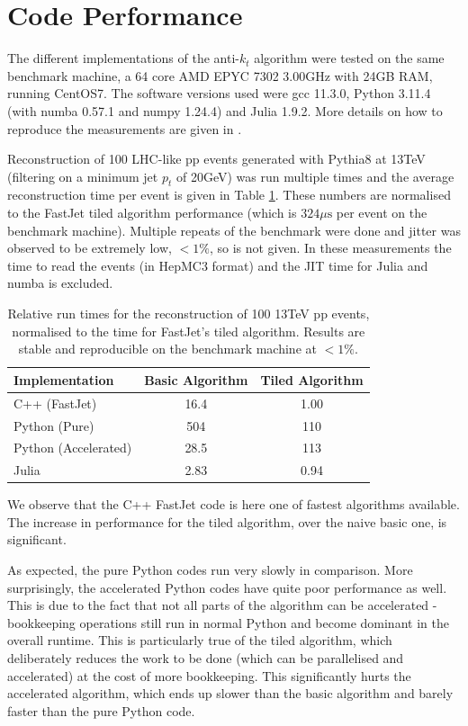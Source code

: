 \documentclass{webofc}
\begin{document}
\section{Code Performance}
\label{sec:performance}

The different implementations of the anti-$k_t$ algorithm were tested on the
same benchmark machine, a 64 core AMD EPYC 7302 \@ 3.00GHz with 24GB RAM,
running CentOS7. The software versions used were gcc 11.3.0, Python 3.11.4 (with
numba 0.57.1 and numpy 1.24.4) and Julia 1.9.2. More details on how to reproduce
the measurements are given in \cite{polyglot-jets-zenodo}.

Reconstruction of 100 LHC-like pp events generated with Pythia8 at 13TeV
(filtering on a minimum jet $p_t$ of 20GeV) was run multiple times and the
average reconstruction time per event is given in Table \ref{tab:results}. These
numbers are normalised to the FastJet tiled algorithm performance (which is
$324\mu \mathrm{s}$ per event on the benchmark machine). Multiple repeats of the
benchmark were done and jitter was observed to be extremely low, $<1\%$, so is
not given. In these measurements the time to read the events (in HepMC3 format)
and the JIT time for Julia and numba is excluded.

\begin{table}[h]
  \begin{center}
    \begin{tabular}{l|cc}
      \textbf{Implementation} & \textbf{Basic Algorithm} & \textbf{Tiled Algorithm} \\
      \hline
      C++ (FastJet) & 16.4 & 1.00 \\
      Python (Pure) & 504 & 110 \\
      Python (Accelerated) & 28.5 & 113 \\
      Julia & 2.83 & 0.94 \\
    \end{tabular}
    \caption{Relative run times for the reconstruction of 100 13TeV pp events, 
    normalised to the time for FastJet's tiled algorithm. Results are stable and 
    reproducible on the benchmark machine at $<1\%$.}
    \label{tab:results}
  \end{center}
\end{table}

We observe that the C++ FastJet code is here one of fastest algorithms
available. The increase in performance for the tiled algorithm, over the naive
basic one, is significant. 

As expected, the pure Python codes run very slowly in comparison. More
surprisingly, the accelerated Python codes have quite poor performance as well.
This is due to the fact that not all parts of the algorithm can be accelerated -
bookkeeping operations still run in normal Python and become dominant in the
overall runtime. This is particularly true of the tiled algorithm, which
deliberately reduces the work to be done (which can be parallelised and
accelerated) at the cost of more bookkeeping. This significantly hurts the
accelerated algorithm, which ends up slower than the basic algorithm and barely
faster than the pure Python code.
\end{document}
